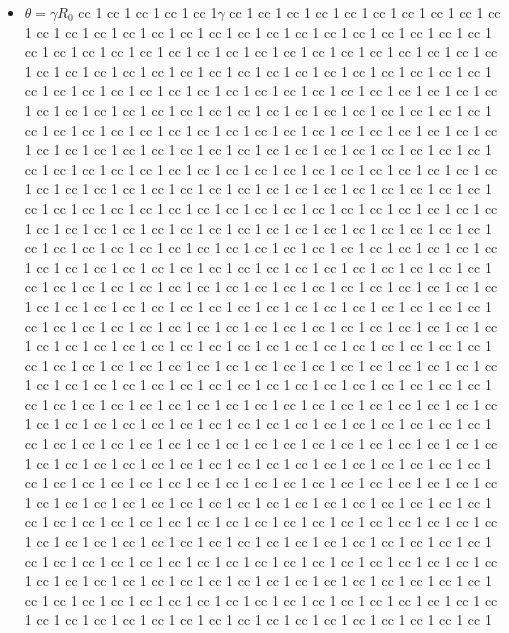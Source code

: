 \documentclass[11pt]{article}
\begin{document}
\begin{itemize}
   \item $\theta=\gamma R_0$ cc 1  cc 1  cc 1  cc 1  cc 1$\gamma$ cc 1
 cc 1  cc 1  cc 1  cc 1  cc 1  cc 1  cc 1  cc 1  cc 1  cc 1  cc 1  cc 1  cc 1  cc 1  cc 1  cc 1  cc 1  cc 1  cc 1  cc 1  cc 1  cc 1  cc 1  cc 1  cc 1  cc 1  cc 1  cc 1  cc 1  cc 1  cc 1  cc 1  cc 1  cc 1  cc 1  cc 1  cc 1  cc 1  cc 1  cc 1  cc 1  cc 1  cc 1  cc 1  cc 1  cc 1  cc 1  cc 1  cc 1  cc 1  cc 1  cc 1  cc 1  cc 1  cc 1  cc 1  cc 1  cc 1  cc 1  cc 1  cc 1  cc 1  cc 1  cc 1  cc 1  cc 1  cc 1  cc 1  cc 1  cc 1  cc 1  cc 1  cc 1  cc 1  cc 1  cc 1  cc 1  cc 1  cc 1  cc 1  cc 1  cc 1  cc 1  cc 1  cc 1  cc 1  cc 1  cc 1  cc 1  cc 1  cc 1  cc 1  cc 1  cc 1  cc 1  cc 1  cc 1  cc 1  cc 1  cc 1  cc 1  cc 1  cc 1  cc 1  cc 1  cc 1  cc 1  cc 1  cc 1  cc 1  cc 1  cc 1  cc 1  cc 1  cc 1  cc 1  cc 1  cc 1  cc 1  cc 1  cc 1  cc 1  cc 1  cc 1  cc 1  cc 1  cc 1  cc 1  cc 1  cc 1  cc 1  cc 1  cc 1  cc 1  cc 1  cc 1  cc 1  cc 1  cc 1  cc 1  cc 1  cc 1  cc 1  cc 1  cc 1  cc 1  cc 1  cc 1  cc 1  cc 1  cc 1  cc 1  cc 1  cc 1  cc 1  cc 1  cc 1  cc 1  cc 1  cc 1  cc 1  cc 1  cc 1  cc 1  cc 1  cc 1  cc 1  cc 1  cc 1  cc 1  cc 1  cc 1  cc 1  cc 1  cc 1  cc 1  cc 1  cc 1  cc 1  cc 1  cc 1  cc 1  cc 1  cc 1  cc 1  cc 1  cc 1  cc 1  cc 1  cc 1  cc 1  cc 1  cc 1  cc 1  cc 1  cc 1  cc 1  cc 1  cc 1  cc 1  cc 1  cc 1  cc 1  cc 1  cc 1  cc 1  cc 1  cc 1  cc 1  cc 1  cc 1  cc 1  cc 1  cc 1  cc 1  cc 1  cc 1  cc 1  cc 1  cc 1  cc 1  cc 1  cc 1  cc 1  cc 1  cc 1  cc 1  cc 1  cc 1  cc 1  cc 1  cc 1  cc 1  cc 1  cc 1  cc 1  cc 1  cc 1  cc 1  cc 1  cc 1  cc 1  cc 1  cc 1  cc 1  cc 1  cc 1  cc 1  cc 1  cc 1  cc 1  cc 1  cc 1  cc 1  cc 1  cc 1  cc 1  cc 1  cc 1  cc 1  cc 1  cc 1  cc 1  cc 1  cc 1  cc 1  cc 1  cc 1  cc 1  cc 1  cc 1  cc 1  cc 1  cc 1  cc 1  cc 1  cc 1  cc 1  cc 1  cc 1  cc 1  cc 1  cc 1  cc 1  cc 1  cc 1  cc 1  cc 1  cc 1  cc 1  cc 1  cc 1  cc 1  cc 1  cc 1  cc 1  cc 1  cc 1  cc 1  cc 1  cc 1  cc 1  cc 1  cc 1  cc 1  cc 1  cc 1  cc 1  cc 1  cc 1  cc 1  cc 1  cc 1  cc 1  cc 1  cc 1  cc 1  cc 1  cc 1  cc 1  cc 1  cc 1  cc 1  cc 1  cc 1  cc 1  cc 1  cc 1  cc 1  cc 1  cc 1  cc 1  cc 1  cc 1  cc 1  cc 1  cc 1  cc 1  cc 1  cc 1  cc 1  cc 1  cc 1  cc 1  cc 1  cc 1  cc 1  cc 1  cc 1  cc 1  cc 1  cc 1  cc 1  cc 1  cc 1  cc 1  cc 1  cc 1  cc 1  cc 1  cc 1  cc 1  cc 1  cc 1  cc 1  cc 1  cc 1  cc 1  cc 1  cc 1  cc 1  cc 1  cc 1  cc 1  cc 1  cc 1  cc 1  cc 1  cc 1  cc 1  cc 1  cc 1  cc 1  cc 1  cc 1  cc 1  cc 1  cc 1  cc 1  cc 1  cc 1  cc 1  cc 1  cc 1  cc 1  cc 1  cc 1  cc 1  cc 1  cc 1  cc 1  cc 1  cc 1  cc 1  cc 1  cc 1  cc 1  cc 1  cc 1  cc 1  cc 1  cc 1  cc 1  cc 1  cc 1  cc 1  cc 1  cc 1  cc 1  cc 1  cc 1  cc 1  cc 1  cc 1  cc 1  cc 1  cc 1  cc 1  cc 1  cc 1  cc 1  cc 1  cc 1  cc 1  cc 1  cc 1  cc 1  cc 1  cc 1  cc 1  cc 1  cc 1  cc 1  cc 1  cc 1  cc 1  cc 1  cc 1  cc 1  cc 1  cc 1  cc 1  cc 1  cc 1  cc 1  cc 1  cc 1  cc 1  cc 1  cc 1  cc 1  cc 1  cc 1  cc 1  cc 1  cc 1  cc 1  cc 1  cc 1  cc 1  cc 1  cc 1  cc 1  cc 1  cc 1  cc 1  cc 1  cc 1  cc 1  cc 1  cc 1  cc 1  cc 1  cc 1  cc 1  cc 1  cc 1  cc 1  cc 1  cc 1  cc 1  cc 1  cc 1  cc 1  cc 1  cc 1  cc 1  cc 1  cc 1  cc 1  cc 1  cc 1  cc 1  cc 1  cc 1  cc 1  cc 1  cc 1  cc 1  cc 1  cc 1  cc 1  cc 1  cc 1  cc 1  cc 1  cc 1  cc 1  cc 1  cc 1  
\end{itemize}
\end{document}
